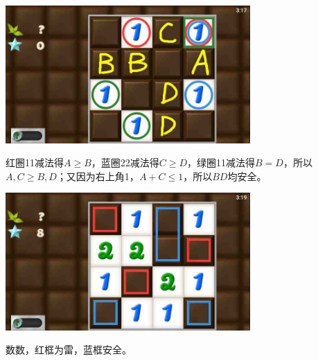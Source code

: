 \subsection{} %
\begin{center}
    \includegraphics[width=0.7\textwidth]{puzzlelow/155-1.jpg}
\end{center}
红圈11减法得$A\ge B$，蓝圈22减法得$C\ge D$，绿圈11减法得$B=D$，所以$A,C\ge B,D$；又因为右上角1，$A+C\le 1$，所以$BD$均安全。
\begin{center}
    \includegraphics[width=0.7\textwidth]{puzzlelow/155-2.jpg}
\end{center}
数数，红框为雷，蓝框安全。


